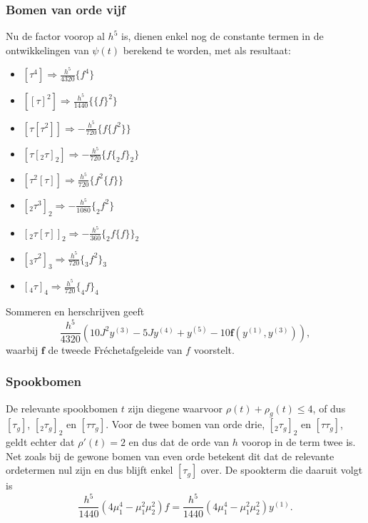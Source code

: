 \documentclass[12pt]{article}
\begin{document}
\subsubsection{Bomen van orde vijf}
Nu de factor voorop al \(h^5\) is, dienen enkel nog de constante termen in de ontwikkelingen van \(\psi(t)\) berekend te worden, met als resultaat:
\begin{itemize}
    \item \([\tau^4]\Rightarrow\frac{h^5}{4320}\{f^4\}\)
    \item \([[\tau]^2]\Rightarrow\frac{h^5}{1440}\{\{f\}^2\}\)
    \item \([\tau[\tau^2]]\Rightarrow-\frac{h^5}{720}\{f\{f^2\}\}\)
    \item \([\tau[_2\tau]_2]\Rightarrow-\frac{h^5}{720}\{f\{_2f\}_2\}\)
    \item \([\tau^2[\tau]]\Rightarrow\frac{h^5}{720}\{f^2\{f\}\}\)
    \item \([_2\tau^3]_2\Rightarrow-\frac{h^5}{1080}\{_2f^2\}\)
    \item \([_2\tau[\tau]]_2\Rightarrow-\frac{h^5}{360}\{_2f\{f\}\}_2\)
    \item \([_3\tau^2]_3\Rightarrow\frac{h^5}{720}\{_3f^2\}_3\)
    \item \([_4\tau]_4\Rightarrow\frac{h^5}{720}\{_4f\}_4\)
\end{itemize}
Sommeren en herschrijven geeft
\[\frac{h^5}{4320}(10J^2y^{(3)}-5Jy^{(4)}+y^{(5)}-10\mathbf{f}(y^{(1)},y^{(3)})),\]
waarbij \(\mathbf{f}\) de tweede Fréchetafgeleide van \(f\) voorstelt.
\subsubsection{Spookbomen}
De relevante spookbomen \(t\) zijn diegene waarvoor \(\rho(t)+\rho_g(t)\le 4\), of dus \([\tau_g]\), \([_2\tau_g]_2\) en \([\tau\tau_g]\). Voor de twee bomen van orde drie, \([_2\tau_g]_2\) en \([\tau\tau_g]\), geldt echter dat \(\rho'(t)=2\) en dus dat de orde van \(h\) voorop in de term twee is. Net zoals bij de gewone bomen van even orde betekent dit dat de relevante ordetermen nul zijn en dus blijft enkel \([\tau_g]\) over. De spookterm die daaruit volgt is
\[\frac{h^5}{1440}\left(4\mu_1^4-\mu_1^2\mu_2^2\right)f=\frac{h^5}{1440}\left(4\mu_1^4-\mu_1^2\mu_2^2\right)y^{(1)}.\]
\end{document}
